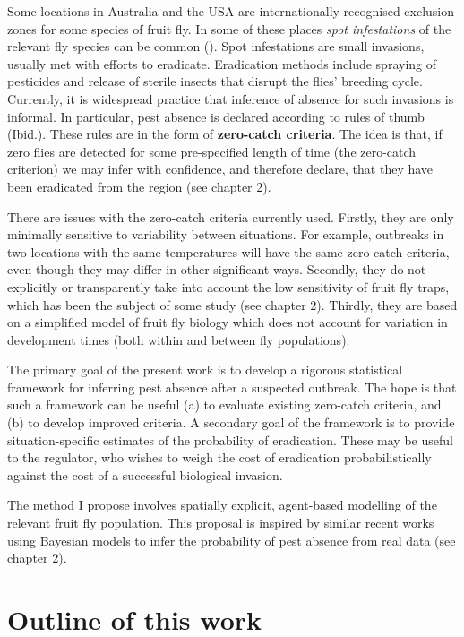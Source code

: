 \documentclass[
  oneside]{book}
\begin{document}
Some locations in Australia and the USA are internationally recognised exclusion zones for some species of fruit fly. In some of these places \emph{spot infestations} of the relevant fly species can be common (\citet{meats2005}). Spot infestations are small invasions, usually met with efforts to eradicate. Eradication methods include spraying of pesticides and release of sterile insects that disrupt the flies' breeding cycle. Currently, it is widespread practice that inference of absence for such invasions is informal. In particular, pest absence is declared according to rules of thumb (Ibid.). These rules are in the form of \textbf{zero-catch criteria}. The idea is that, if zero flies are detected for some pre-specified length of time (the zero-catch criterion) we may infer with confidence, and therefore declare, that they have been eradicated from the region (see chapter 2).

There are issues with the zero-catch criteria currently used. Firstly, they are only minimally sensitive to variability between situations. For example, outbreaks in two locations with the same temperatures will have the same zero-catch criteria, even though they may differ in other significant ways. Secondly, they do not explicitly or transparently take into account the low sensitivity of fruit fly traps, which has been the subject of some study (see chapter 2). Thirdly, they are based on a simplified model of fruit fly biology which does not account for variation in development times (both within and between fly populations).

The primary goal of the present work is to develop a rigorous statistical framework for inferring pest absence after a suspected outbreak. The hope is that such a framework can be useful (a) to evaluate existing zero-catch criteria, and (b) to develop improved criteria. A secondary goal of the framework is to provide situation-specific estimates of the probability of eradication. These may be useful to the regulator, who wishes to weigh the cost of eradication probabilistically against the cost of a successful biological invasion.

The method I propose involves spatially explicit, agent-based modelling of the relevant fruit fly population. This proposal is inspired by similar recent works using Bayesian models to infer the probability of pest absence from real data (see chapter 2).

\hypertarget{outline-of-this-work}{%
\section{Outline of this work}\label{outline-of-this-work}}
\end{document}
